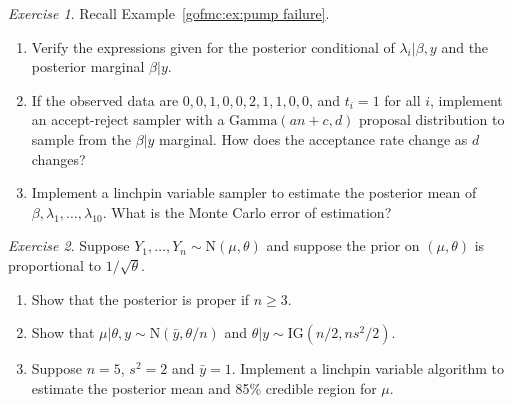 \documentclass[12pt]{article}
\theoremstyle{plain}
\theoremstyle{definition}
\theoremstyle{remark}
\newtheorem{hw}{Exercise}[section]
\begin{document}
\begin{hw}\label{gofmc:hw:pump failure}
Recall Example~\ref{gofmc:ex:pump failure}.  
\begin{enumerate}
\item Verify the expressions given for the posterior conditional of
  $\lambda_i |\beta, y$ and the posterior marginal $\beta |y$. 
\item If the observed data are $0, 0, 1, 0, 0, 2, 1, 1, 0, 0$, and
  $t_i =1$ for all $i$, implement an accept-reject sampler with a
  $\text{Gamma}(an+c , d)$ proposal distribution to sample from the
  $\beta |y$ marginal.  How does the acceptance rate change as $d$
  changes? 

\item Implement a linchpin variable sampler to estimate the posterior
  mean of $\beta, \lambda_1, \ldots, \lambda_{10}$.  What is the Monte
  Carlo error of estimation? 
\end{enumerate}
\end{hw}

\begin{hw} \label{gofmc:hw:jh2001}
Suppose $Y_{1},\ldots,Y_{n} \sim \text{N}(\mu, \theta)$ and suppose
the prior on $(\mu, \theta)$ is proportional to $1/\sqrt{\theta}$. 
\begin{enumerate}
\item Show that the posterior is proper if $n \ge 3$.
\item Show that $\mu | \theta, y \sim \text{N}(\bar{y}, \theta / n)$ and $\theta | y \sim \text{IG}(n/2, ns^{2} / 2)$.
\item Suppose $n=5$, $s^{2} = 2$ and $\bar{y}=1$.  Implement a
  linchpin variable algorithm to estimate the posterior mean and 85\%
  credible region for $\mu$.  
\end{enumerate}
\end{hw}
\end{document}
